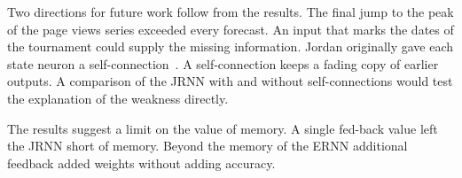 \documentclass[conference,10pt]{IEEEtran}
\begin{document}
Two directions for future work follow from the results.
The final jump to the peak of the page views series exceeded every
forecast.
An input that marks the dates of the tournament could supply the
missing information.
Jordan originally gave each state neuron a
self-connection~\cite{jordan1986}.
A self-connection keeps a fading copy of earlier outputs.
A comparison of the JRNN with and without self-connections would test
the explanation of the weakness directly.

The results suggest a limit on the value of memory.
A single fed-back value left the JRNN short of memory.
Beyond the memory of the ERNN additional feedback added weights without
adding accuracy.



\end{document}
